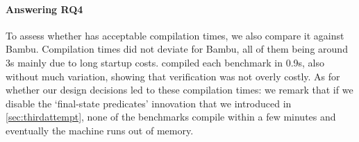 \paragraph{Answering RQ4}
To assess whether \VericertHyper{} has acceptable compilation times, we also compare it against Bambu.  Compilation times did not deviate for Bambu, all of them being around 3s mainly due to long startup costs. \VericertHyper{} compiled each benchmark in 0.9s, also without much variation, showing that verification was not overly costly.  As for whether our design decisions led to these compilation times: we remark that if we disable the `final-state predicates' innovation that we introduced in \cref{sec:thirdattempt}, none of the benchmarks compile within a few minutes and eventually the machine runs out of memory.




